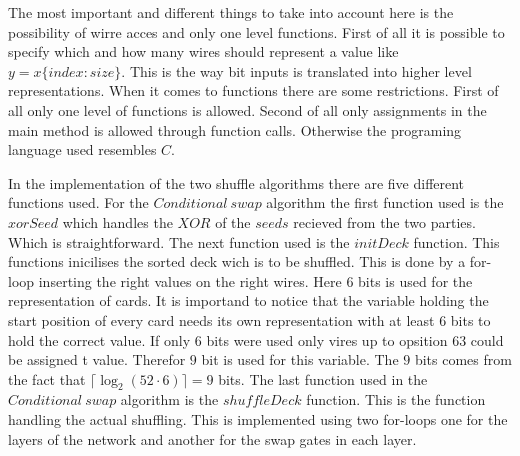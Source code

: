 The most important and different things to take into account here is the possibility of wirre acces and only one level functions. First of all it is possible to specify which and how many wires should represent a value like $y=x\{index:size\}$. This is the way bit inputs is translated into higher level representations. When it comes to functions there are some restrictions. First of all only one level of functions is allowed. Second of all only assignments in the main method is allowed through function calls. Otherwise the programing language used resembles $C$.

\bigskip

In the implementation of the two shuffle algorithms there are five different functions used. For the $Conditional~swap$ algorithm the first function used is the $xorSeed$ which handles the $XOR$ of the $seeds$ recieved from the two parties. Which is straightforward. The next function used is the $initDeck$ function. This functions inicilises the sorted deck wich is to be shuffled. This is done by a for-loop inserting the right values on the right wires. Here $6$ bits is used for the representation of cards. It is importand to notice that the variable holding the start position of every card needs its own representation with at least $6$ bits to hold the correct value. If only $6$ bits were used only vires up to opsition $63$ could be assigned t value. Therefor $9$ bit is used for this variable. The $9$ bits comes from the fact that $\lceil \log_2(52\cdot 6)\rceil=9$ bits. The last function used in the $Conditional~swap$ algorithm is the $shuffleDeck$ function. This is the function handling the actual shuffling. This is implemented using two for-loops one for the layers of the network and another for the swap gates in each layer.

\bigskip

